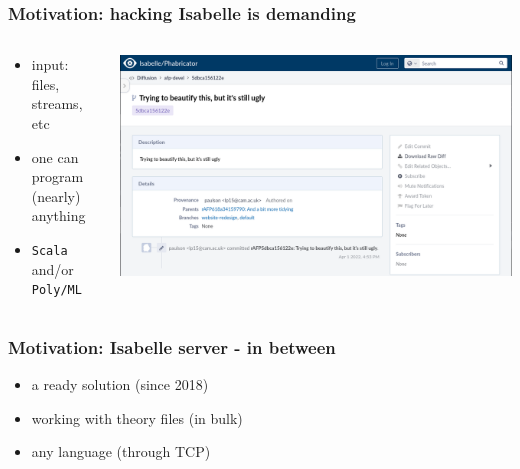 \documentclass{beamer}
\begin{document}
\begin{frame}
\frametitle{Motivation: hacking Isabelle is demanding}
\begin{columns}[T]
\begin{column}{0.45\textwidth}
\begin{itemize}
\item input: files, streams, etc
\item one can program (nearly) anything
\item \texttt{Scala} and/or \texttt{Poly/ML}
\end{itemize}
\end{column}
\begin{column}{0.55\textwidth}
\includegraphics[width=\paperwidth,height=\paperheight]{still-ugly}
\end{column}
\end{columns}
\end{frame}
\begin{frame}[t]
\frametitle{Motivation: Isabelle server - in between}
\begin{itemize}
\item a ready solution (since 2018)
\item working with theory files (in bulk)
\item any language (through TCP)
\end{itemize}
\end{frame}
\end{document}
